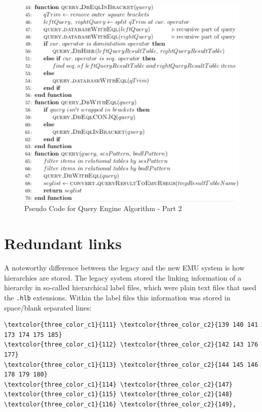 \documentclass[]{book}
\begin{document}
\begin{figure}

{\centering \includegraphics[width=0.9\linewidth]{pics/algorithm2} 

}

\caption{Pseudo Code for Query Engine Algorithm - Part 2}\label{fig:query-implQueryEnginePC-p2}
\end{figure}

\hypertarget{subsec:query-redundantLinks}{%
\section{Redundant links}\label{subsec:query-redundantLinks}}

A noteworthy difference between the legacy and the new EMU system is how hierarchies are stored. The legacy system stored the linking information of a hierarchy in so-called hierarchical label files, which were plain text files that used the \texttt{.hlb} extensions. Within the label files this information was stored in space/blank separated lines:

\begin{verbatim}
\textcolor{three_color_c1}{111} \textcolor{three_color_c2}{139 140 141 173 174 175 185}
\textcolor{three_color_c1}{112} \textcolor{three_color_c2}{142 143 176 177}
\textcolor{three_color_c1}{113} \textcolor{three_color_c2}{144 145 146 178 179 180}
\textcolor{three_color_c1}{114} \textcolor{three_color_c2}{147}
\textcolor{three_color_c1}{115} \textcolor{three_color_c2}{148}
\textcolor{three_color_c1}{116} \textcolor{three_color_c2}{149},
\end{verbatim}
\end{document}
